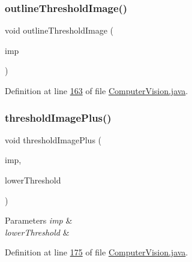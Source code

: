 \subsubsection{\texorpdfstring{outline\+Threshold\+Image()}{outlineThresholdImage()}}
{\footnotesize\ttfamily void outline\+Threshold\+Image (\begin{DoxyParamCaption}\item[{Image\+Plus}]{imp }\end{DoxyParamCaption})}



Definition at line \hyperlink{_computer_vision_8java_source_l00163}{163} of file \hyperlink{_computer_vision_8java_source}{Computer\+Vision.\+java}.

\hypertarget{classfunctions_1_1_computer_vision_a75c4bdce2977d9dcfe309e60b16cbf4f}{}\label{classfunctions_1_1_computer_vision_a75c4bdce2977d9dcfe309e60b16cbf4f} 
\subsubsection{\texorpdfstring{threshold\+Image\+Plus()}{thresholdImagePlus()}}
{\footnotesize\ttfamily void threshold\+Image\+Plus (\begin{DoxyParamCaption}\item[{Image\+Plus}]{imp,  }\item[{double}]{lower\+Threshold }\end{DoxyParamCaption})}


\begin{DoxyParams}{Parameters}
{\em imp} & \\
\hline
{\em lower\+Threshold} & \\
\hline
\end{DoxyParams}


Definition at line \hyperlink{_computer_vision_8java_source_l00175}{175} of file \hyperlink{_computer_vision_8java_source}{Computer\+Vision.\+java}.

\hypertarget{classfunctions_1_1_computer_vision_ae1ef4c4258127cb97bae706e7f65fc2e}{}\label{classfunctions_1_1_computer_vision_ae1ef4c4258127cb97bae706e7f65fc2e} 
